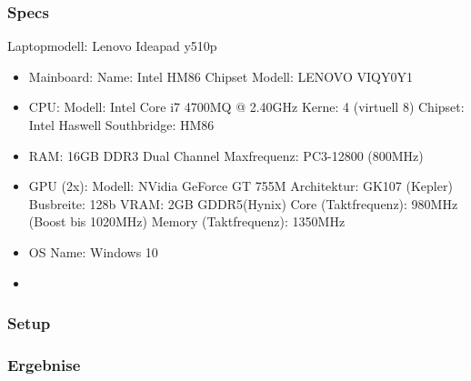 \subsubsection{Specs}
Laptopmodell: Lenovo Ideapad y510p\\
\begin{itemize}
	\item Mainboard:
	\subitem Name: Intel HM86 Chipset
	\subitem Modell: LENOVO VIQY0Y1
	\item CPU:
	\subitem Modell: Intel Core i7 4700MQ @ 2.40GHz
	\subitem Kerne: 4 (virtuell 8)
	\subitem Chipset: Intel Haswell
	\subitem Southbridge: HM86
	\subitem 
	\item RAM:
	\subitem 16GB DDR3
	\subitem Dual Channel
	\subitem Maxfrequenz: PC3-12800 (800MHz)
	\item GPU (2x):
	\subitem Modell: NVidia GeForce GT 755M
	\subitem Architektur: GK107 (Kepler)
	\subitem Busbreite: 128b
	\subitem VRAM: 2GB GDDR5(Hynix)
	\subitem Core (Taktfrequenz): 980MHz (Boost bis 1020MHz)
	\subitem Memory (Taktfrequenz): 1350MHz
	
	\item OS
	\subitem Name: Windows 10 
	\item 
	
\end{itemize}
\subsubsection{Setup}
\subsubsection{Ergebnise}
